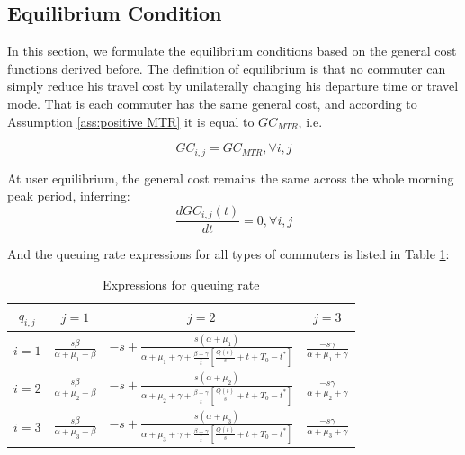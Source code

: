 \documentclass[a4paper,11pt]{article}
\begin{document}
\subsection{Equilibrium Condition} \label{subs:Equilibrium Condition}
In this section, we formulate the equilibrium conditions based on the general cost functions derived before. The definition of equilibrium is that no commuter can simply reduce his travel cost by unilaterally changing his departure time or travel mode. That is each commuter has the same general cost, and according to Assumption \ref{ass:positive MTR} it is equal to $GC_{MTR}$, i.e.

\begin{equation} \label{GC eqaution}
    GC_{i,j}=GC_{MTR}, \forall i,j
\end{equation}

At user equilibrium, the general cost remains the same across the whole morning peak period, inferring:
\begin{equation} \label{queing rate}
    \frac{d{GC}_{i,j}\left(t\right)}{dt}=0, \forall i,j
\end{equation}

And the queuing rate expressions for all types of commuters is listed in Table \ref{tab:queuing rate}:

\begin{table}[htbp]
 \caption{Expressions for queuing rate \label{tab:queuing rate}}
 \begin{center}
 \begin{tabular}{cccc}
 
  \toprule
   $q_{i,j}$ & $j=1$ & $j=2$ & $j=3$  \\
  \midrule
  $i=1$ & $\frac{s\beta}{\alpha+\mu_1-\beta}$ & $-s+\frac{s(\alpha+\mu_1)}{\alpha+\mu_1+\gamma+\frac{\beta+\gamma}{\bar{t}}\left[\frac{Q\left(t\right)}{s}+t+T_0-t^\ast\right]}$ & $\frac{-s\gamma}{\alpha+\mu_1+\gamma}$ \\
  
  $i=2$ & $\frac{s\beta}{\alpha+\mu_2-\beta}$ & $-s+\frac{s(\alpha+\mu_2)}{\alpha+\mu_2+\gamma+\frac{\beta+\gamma}{\bar{t}}\left[\frac{Q\left(t\right)}{s}+t+T_0-t^\ast\right]}$ & $\frac{-s\gamma}{\alpha+\mu_2+\gamma}$ \\
  
  $i=3$ & $\frac{s\beta}{\alpha+\mu_3-\beta}$ & $-s+\frac{s(\alpha+\mu_3)}{\alpha+\mu_3+\gamma+\frac{\beta+\gamma}{\bar{t}}\left[\frac{Q\left(t\right)}{s}+t+T_0-t^\ast\right]}$ & $\frac{-s\gamma}{\alpha+\mu_3+\gamma}$ \\
  \bottomrule
  
 \end{tabular}
 \end{center}
\end{table}
\end{document}
